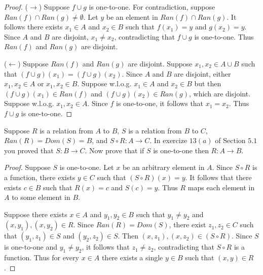\begin{proof}
    ($\rightarrow$) Suppose $f \cup g$ is one-to-one.
    For contradiction, suppose $Ran(f) \cap Ran(g) \ne \emptyset$.
    Let $y$ be an element in $Ran(f) \cap Ran(g)$.
    It follows there exists $x_1 \in A$ and $x_2 \in B$
        such that $f(x_1) = y$ and $g(x_2) = y$.
    Since $A$ and $B$ are disjoint, $x_1 \ne x_2$,
    contradicting that $f \cup g$ is one-to-one.
    Thus $Ran(f)$ and $Ran(g)$ are disjoint.

    ($\leftarrow$) Suppose $Ran(f)$ and $Ran(g)$ are disjoint.
    Suppose $x_1, x_2 \in A \cup B$ such that $(f \cup g)(x_1) = (f \cup g)(x_2)$.
    Since $A$ and $B$ are disjoint, either $x_1, x_2 \in A$ or $x_1, x_2 \in B$.
    Suppose w.l.o.g.  $x_1 \in A$ and $x_2 \in B$ but
    then $(f \cup g)(x_1) \in Ran(f)$ and $(f \cup g)(x_2) \in Ran(g)$,
        which are disjoint.
    Suppose w.l.o.g. $x_1, x_2 \in A$. Since $f$ is one-to-one, it follows that 
        $x_1 = x_2$.
    Thus $f \cup g$ is one-to-one.
\end{proof}

\begin{tcolorbox}[title=Problem 16, breakable]
    Suppose $R$ is a relation from $A$ to $B$, $S$ is a relation 
        from $B$ to $C$, $Ran(R) = Dom(S) = B$,
        and $S \circ R : A \rightarrow C$.
    In exercize $13(a)$ of Section $5.1$ you proved that 
        $S : B \rightarrow C$.
    Now prove that if $S$ is one-to-one then $R : A \rightarrow B$.
\end{tcolorbox}

\begin{proof}
    Suppose $S$ is one-to-one.
    Let $x$ be an arbitrary element in $A$.
    Since $S \circ R$ is a function, there exists $y \in C$
        such that $(S \circ R)(x) = y$.
    It follows that there exists $c \in B$ such that 
        $R(x) = c$ and $S(c) = y$.
    Thus $R$ maps each element in $A$ to some element in $B$.

    Suppose there exists $x \in A$ and $y_1, y_2 \in B$
        such that $y_1 \ne y_2$ and $(x, y_1), (x, y_2) \in R$.
    Since $Ran(R) = Dom(S)$, there exist $z_1, z_2 \in C$
        such that $(y_1, z_1) \in S$ and $(y_2, z_2) \in S$.
    Then $(x, z_1), (x, z_2) \in (S \circ R)$.
    Since $S$ is one-to-one and $y_1 \ne y_2$, it follows that $z_1 \ne z_2$,
        contradicting that $S \circ R$ is a function.
    Thus for every $x \in A$ there exists a single $y \in B$
        such that $(x, y) \in R$.
\end{proof}

